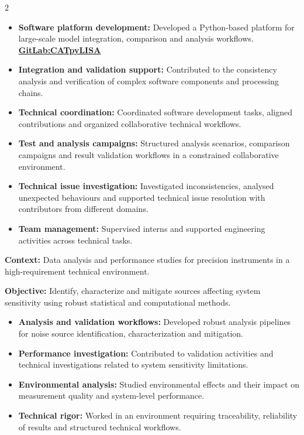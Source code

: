 \documentclass[8pt,a4paper,ragged2e,withhyper]{altacv}
\begin{document}
\begin{paracol}{2}
\begin{itemize}
\item \textbf{Software platform development:} Developed a Python-based platform for large-scale model integration, comparison and analysis workflows. \textcolor{DarkPastelRed}{\href{https://gitlab.oca.eu/gboileau/lisa_l3_tools}{\bf GitLab:CATpyLISA}}
\item \textbf{Integration and validation support:} Contributed to the consistency analysis and verification of complex software components and processing chains.
\item \textbf{Technical coordination:} Coordinated software development tasks, aligned contributions and organized collaborative technical workflows.
\item \textbf{Test and analysis campaigns:} Structured analysis scenarios, comparison campaigns and result validation workflows in a constrained collaborative environment.
\item \textbf{Technical issue investigation:} Investigated inconsistencies, analysed unexpected behaviours and supported technical issue resolution with contributors from different domains.
\item \textbf{Team management:} Supervised interns and supported engineering activities across technical tasks.
\end{itemize}

\divider


\textbf{Context:} Data analysis and performance studies for precision instruments in a high-requirement technical environment.

\textbf{Objective:} Identify, characterize and mitigate sources affecting system sensitivity using robust statistical and computational methods.

\begin{itemize}
\item \textbf{Analysis and validation workflows:} Developed robust analysis pipelines for noise source identification, characterization and mitigation.
\item \textbf{Performance investigation:} Contributed to validation activities and technical investigations related to system sensitivity limitations.
\item \textbf{Environmental analysis:} Studied environmental effects and their impact on measurement quality and system-level performance.
\item \textbf{Technical rigor:} Worked in an environment requiring traceability, reliability of results and structured technical workflows.
\end{itemize}


\end{paracol}
\end{document}
